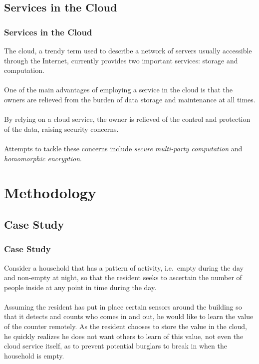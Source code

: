 \documentclass{beamer}
\begin{document}
\subsection{Services in the Cloud}
\begin{frame}
\frametitle{Services in the Cloud}
The cloud, a trendy term used to describe a network of servers usually accessible through the Internet, currently provides two important services: storage and computation. \\~\\

One of the main advantages of employing a service in the cloud is that the owners are relieved from the burden of data storage and maintenance at all times. \\~\\

By relying on a cloud service, the owner is relieved of the control and protection of the data, raising security concerns. \\~\\

Attempts to tackle these concerns include \emph{secure multi-party computation} and \emph{homomorphic encryption}. 
\end{frame}
\section{Methodology}
\subsection{Case Study}
\begin{frame}
\frametitle{Case Study}

Consider a household that has a pattern of activity, i.e.\ empty during the day and non-empty at night, so that the resident seeks to ascertain the number of people inside at any point in time during the day. \\~\\

Assuming the resident has put in place certain sensors around the building so that it detects and counts who comes in and out, he would like to learn the value of the counter remotely. As the resident chooses to store the value in the cloud, he quickly realizes he does not want others to learn of this value, not even the cloud service itself, as to prevent potential burglars to break in when the household is empty.

\end{frame}
\end{document}
